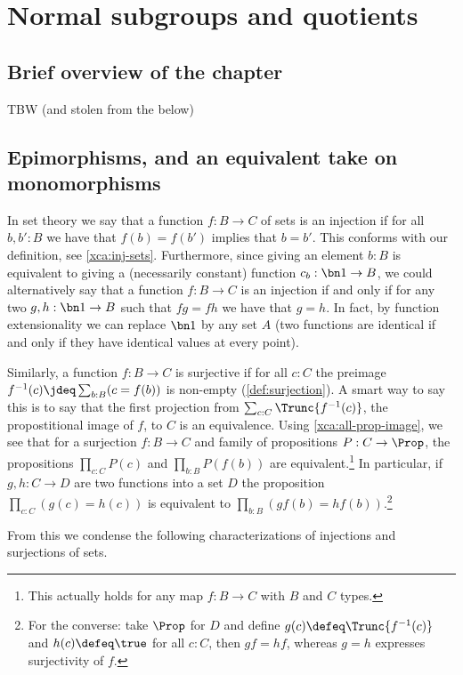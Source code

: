\chapter{Normal subgroups and quotients}
\label{ch:subgroups}


\section{Brief overview of the chapter}
\label{sec:subgp-overview}

TBW (and stolen from the below)

\section{Epimorphisms, and an equivalent take on monomorphisms}
\label{sec:epis}

In set theory we say that a function $f:B\to C$ of sets is an injection if for all $b,b':B$ we have that $f(b)=f(b')$ implies that  $b=b'$.  This conforms with our definition, see \cref{xca:inj-sets}.
Furthermore, since giving an element $b:B$ is equivalent to giving a (necessarily constant) function $c_b:\bn 1\to B$, we could alternatively say that a function $f:B\to C$ is an injection if and only if for any two $g,h:\bn 1\to B$ such that $fg=fh$ we have that $g=h$.  In fact, by function extensionality we can replace $\bn 1$ by any set $A$ (two functions are identical if and only if they have identical values at every point).

Similarly, a function $f:B\to C$ is surjective if for all $c:C$ the preimage $f^{-1}(c)\jdeq\sum_{b:B}(c=f(b))$ is non-empty (\cref{def:surjection}). A smart way to say this is to say that the first projection from $\sum_{c:C}\Trunc{f^{-1}(c)}$, the propostitional image of $f$, to $C$ is an equivalence. Using \cref{xca:all-prop-image}, we see that for a surjection $f:B\to C$ and family of propositions $P:C\to \Prop$, the propositions $\prod_{c:C}P(c)$ and $\prod_{b:B}P(f(b))$ are equivalent.\footnote{This actually holds for any
map $f:B\to C$ with $B$ and $C$ types.}  In particular, if $g,h:C\to D$ are two functions into a set $D$ the proposition $\prod_{c:C}(g(c)=h(c))$ is equivalent to $\prod_{b:B}(gf(b)=hf(b))$.\footnote{For the converse:
take $\Prop$ for $D$ and define $g(c)\defeq\Trunc{f^{-1}(c)}$
and $h(c)\defeq\true$ for all $c:C$, then $gf=hf$, whereas $g=h$
expresses surjectivity of $f$.}

From this we condense the following characterizations of injections and surjections of sets. 

